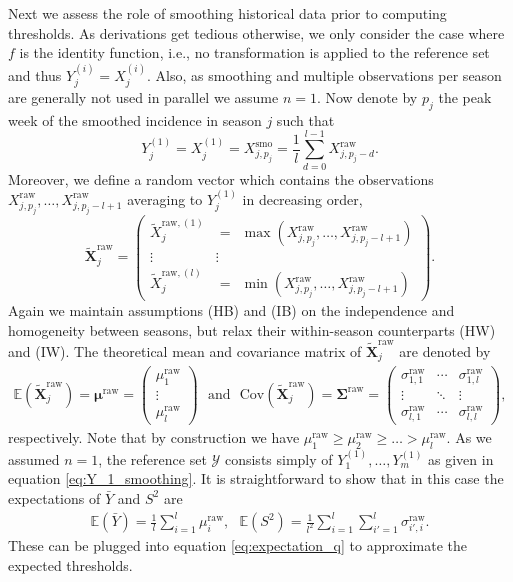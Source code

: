 \documentclass[12pt]{article}
\begin{document}
Next we assess the role of smoothing historical data prior to computing thresholds. As derivations get tedious otherwise, we only consider the case where $f$ is the identity function, i.e., no transformation is applied to the reference set and thus $
Y^{(i)}_j = X^{(i)}_j$. Also, as smoothing and multiple observations per season are generally not used in parallel we assume $n = 1$. Now denote by $p_j$ the peak week of the smoothed incidence in season $j$ such that
\begin{equation}
Y_j^{(1)} =  X_j^{(1)} = X^{\text{smo}}_{j, p_j} = \frac{1}{l} \sum_{d = 0}^{l - 1} X^{\text{raw}}_{j, p_j - d}.\label{eq:Y_1_smoothing}
\end{equation}
Moreover, we define a random vector which contains the observations $X^{\text{raw}}_{j, p_j}, \dots, X^{\text{raw}}_{j, p_j - l + 1}$ averaging to $Y_j^{(1)}$ in decreasing order,
$$
\tilde{\mathbf{X}}^\text{raw}_j = \begin{pmatrix} \tilde{X}_j^{\text{raw}, (1)} & = \ \ \max(X^{\text{raw}}_{j, p_j}, \dots, X^{\text{raw}}_{j, p_j - l + 1}) \\ \vdots & \vdots \\ \tilde{X}_j^{\text{raw}, (l)} & = \ \ \min(X^{\text{raw}}_{j, p_j}, \dots, X^{\text{raw}}_{j, p_j - l + 1}) \end{pmatrix}.
$$
Again we maintain assumptions (HB) and (IB) on the independence and homogeneity between seasons, but relax their within-season counterparts (HW) and (IW). The theoretical mean and covariance matrix of $\tilde{\mathbf{X}}^\text{raw}_j$ are denoted by
\begin{align}
\mathbb{E}\left(\tilde{\mathbf{X}}^\text{raw}_j\right) = \boldsymbol{\mu}^\text{raw} = \left(\begin{array}{c}
\mu^\text{raw}_1\\
\vdots\\
\mu^\text{raw}_l
\end{array}\right) \ \ \ \text{and} \ \ \ \text{Cov}\left(\tilde{\mathbf{X}}^\text{raw}_j\right) = \boldsymbol{\Sigma}^\text{raw} =
\left(\begin{array}{ccc}
\sigma^\text{raw}_{1, 1} & \cdots & \sigma^\text{raw}_{1, l}\\
\vdots & \ddots &\vdots\\
\sigma^\text{raw}_{l, 1} & \cdots & \sigma^\text{raw}_{l, l}
\end{array}\right),
\end{align}
respectively. Note that by construction we have $\mu^\text{raw}_1 \geq \mu^\text{raw}_2 \geq \dots > \mu^\text{raw}_l$. As we assumed $n = 1$, the reference set $\mathcal{Y}$ consists simply of $Y^{(1)}_1, \dots, Y^{(1)}_m$ as given in equation \eqref{eq:Y_1_smoothing}. It is straightforward to show that in this case the expectations of $\bar{Y}$ and $S^2$ are
\begin{align}
\mathbb{E}(\bar{Y}) = \frac{1}{l} \sum_{i = 1}^l \mu^\text{raw}_i, \ \ \ 
\mathbb{E}(S^2) = \frac{1}{l^2} \sum_{i = 1}^l \sum_{i' = 1}^l \sigma^\text{raw}_{i', i}.
\label{eq:expectation_moments_smoothing}
\end{align}
These can be plugged into equation \eqref{eq:expectation_q} to approximate the expected thresholds. 
\end{document}
